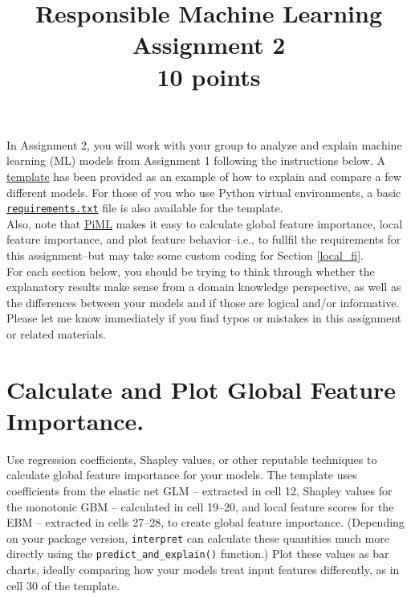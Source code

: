 \documentclass[fleqn]{article}
\title{Responsible Machine Learning\\\Large{Assignment 2}\\\Large{10 points}}
\begin{document}
\maketitle

\noindent In Assignment 2, you will work with your group to analyze and explain machine learning (ML) models from Assignment 1 following the instructions below. A \href{https://nbviewer.jupyter.org/github/jphall663/GWU_rml/blob/master/assignments/assignment_2/assign_2_template.ipynb?flush_cache=true}{template} has been provided as an example of how to explain and compare a few different models. For those of you who use Python virtual environments, a basic \href{https://github.com/jphall663/GWU_rml/blob/master/assignments/requirements.txt}{\texttt{requirements.txt}} file is also available for the template.\\

\noindent Also, note that \href{https://github.com/SelfExplainML/PiML-Toolbox}{PiML} makes it easy to calculate global feature importance, local feature importance, and plot feature behavior--i.e., to fullfil the requirements for this assignment--but may take some custom coding for Section \ref{local_fi}.\\

\noindent For each section below, you should be trying to think through whether the explanatory results make sense from a domain knowledge perspective, as well as the differences between your models and if those are logical and/or informative.\\

\noindent Please let me know immediately if you find typos or mistakes in this assignment or related materials. 

\section{Calculate and Plot Global Feature Importance.}\label{global_fi}

Use regression coefficients, Shapley values, or other reputable techniques to calculate global feature importance for your models. The template uses coefficients from the elastic net GLM -- extracted in cell 12, Shapley values for the monotonic GBM -- calculated in cell 19--20, and local feature scores for the EBM -- extracted in cells 27--28, to create global feature importance. (Depending on your package version, \texttt{interpret} can calculate these quantities much more directly using the \texttt{predict\_and\_explain()} function.) Plot these values as bar charts, ideally comparing how your models treat input features differently, as in cell 30 of the template.\\
\end{document}
